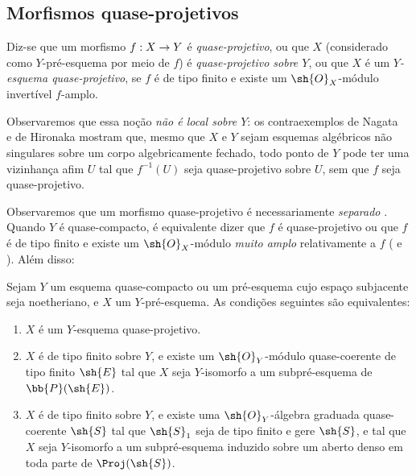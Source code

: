 \documentclass[oneside,10pt]{amsart}
\makeatletter
\newcommand{\ega@arrow}[2]{\mathchoice{#1}{#2}{#2}{#2}}
\renewcommand{\to}{\ega@arrow{\longrightarrow}{\rightarrow}}
\let\EGAOriginalLabel\label
\renewcommand{\label}[1]{\phantomsection\EGAOriginalLabel{#1}}
\makeatother
\begin{document}
\subsection{Morfismos quase-projetivos}
\label{subsection:II.5.3}

\begin{definition}[5.3.1]
\label{II.5.3.1}
Diz-se que um morfismo $f:X\to Y$ é \emph{quase-projetivo}, ou que $X$ (considerado como $Y$-pré-esquema por meio de $f$) é \emph{quase-projetivo sobre $Y$}, ou que $X$ é um \emph{$Y$-esquema quase-projetivo}, se $f$ é de tipo finito e existe um $\sh{O}_X$-módulo invertível $f$-amplo.
\end{definition}

Observaremos que essa noção \emph{não é local sobre $Y$}:
os contraexemplos de Nagata~\cite{II-26} e de Hironaka mostram que, mesmo que $X$ e $Y$ sejam esquemas algébricos não singulares sobre um corpo algebricamente fechado, todo ponto de $Y$ pode ter uma vizinhança afim $U$ tal que $f^{-1}(U)$ seja quase-projetivo sobre $U$, sem que $f$ seja quase-projetivo.

Observaremos que um morfismo quase-projetivo é necessariamente \emph{separado} .
Quando $Y$ é quase-compacto, é equivalente dizer que $f$ é quase-projetivo ou que $f$ é de tipo finito e existe um $\sh{O}_X$-módulo \emph{muito amplo} relativamente a $f$ ( e ).
Além disso:

\begin{proposition}[5.3.2]
\label{II.5.3.2}
Sejam $Y$ um esquema quase-compacto ou um pré-esquema cujo espaço subjacente seja noetheriano, e $X$ um $Y$-pré-esquema.
As condições seguintes são equivalentes:
\begin{enumerate}
  \item[{\rm(a)}] $X$ é um $Y$-esquema quase-projetivo.
  \item[{\rm(b)}] $X$ é de tipo finito sobre $Y$, e existe um $\sh{O}_Y$-módulo quase-coerente de tipo finito $\sh{E}$ tal que $X$ seja $Y$-isomorfo a um subpré-esquema de $\bb{P}(\sh{E})$.
  \item[{\rm(c)}] $X$ é de tipo finito sobre $Y$, e existe uma $\sh{O}_Y$-álgebra graduada quase-coerente $\sh{S}$ tal que $\sh{S}_1$ seja de tipo finito e gere $\sh{S}$, e tal que $X$ seja $Y$-isomorfo a um subpré-esquema induzido sobre um aberto denso em toda parte de $\Proj(\sh{S})$.
\end{enumerate}
\end{proposition}
\end{document}

